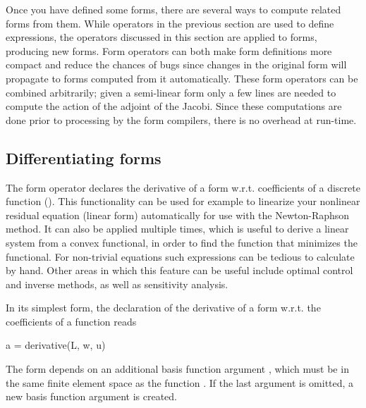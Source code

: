 Once you have defined some forms, there are several ways to compute
related forms from them.  While operators in the previous section are
used to define expressions, the operators discussed in this section
are applied to forms, producing new forms.  Form operators can both
make form definitions more compact and reduce the chances of bugs
since changes in the original form will propagate to forms computed
from it automatically.  These form operators can be combined
arbitrarily; given a semi-linear form only a few lines are needed to
compute the action of the adjoint of the Jacobi.  Since these
computations are done prior to processing by the form compilers, there
is no overhead at run-time.

\subsection{Differentiating forms}
\label{ufl:sec:derivative}

The form operator  declares the derivative of a form
w.r.t. coefficients of a discrete function ().  This
functionality can be used for example to linearize your nonlinear
residual equation (linear form) automatically for use with the
Newton-Raphson method.  It can also be applied multiple times, which
is useful to derive a linear system from a convex functional, in order
to find the function that minimizes the functional.  For non-trivial
equations such expressions can be tedious to calculate by hand.  Other
areas in which this feature can be useful include optimal control and
inverse methods, as well as sensitivity analysis.

In its simplest form, the declaration of the derivative of a form
 w.r.t. the coefficients of a function  reads
\begin{python}
a = derivative(L, w, u)
\end{python}
The form  depends on an additional basis function argument
, which must be in the same finite element space as the function .
If the last argument is omitted, a new basis function argument is
created.

